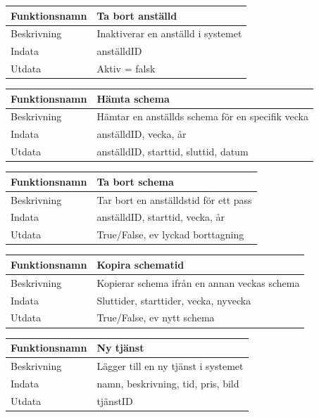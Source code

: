 \documentclass[11pt, titlepage, oneside, a4paper]{article}	%
\begin{document}
\begin{tabular}{ll}
\hline
Funktionsnamn & Ta bort anställd                 \\ \hline
Beskrivning   & Inaktiverar en anställd i systemet \\ \hline
Indata        & anställdID   \\ \hline
Utdata        & Aktiv = falsk  \\ \hline
\end{tabular}

\begin{tabular}{ll}
\hline
Funktionsnamn & Hämta schema                 \\ \hline
Beskrivning   & Hämtar en anställds schema för en specifik vecka \\ \hline
Indata        & anställdID, vecka, år \\ \hline
Utdata        & anställdID, starttid, sluttid, datum  \\ \hline
\end{tabular}

\begin{tabular}{ll}
\hline
Funktionsnamn & Ta bort schema                 \\ \hline
Beskrivning   & Tar bort en anställdstid för ett pass \\ \hline
Indata        & anställdID, starttid, vecka, år \\ \hline
Utdata        & True/False, ev lyckad borttagning  \\ \hline
\end{tabular}

\begin{tabular}{ll}
\hline
Funktionsnamn & Kopira schematid                 \\ \hline
Beskrivning   & Kopierar schema ifrån en annan veckas schema \\ \hline
Indata        & Sluttider, starttider, vecka, nyvecka \\ \hline
Utdata        & True/False, ev nytt schema  \\ \hline
\end{tabular}

\begin{tabular}{ll}
\hline
Funktionsnamn & Ny tjänst              \\ \hline
Beskrivning   & Lägger till en ny tjänst i systemet \\ \hline
Indata        & namn, beskrivning, tid, pris, bild \\ \hline
Utdata        & tjänstID  \\ \hline
\end{tabular}
\end{document}
